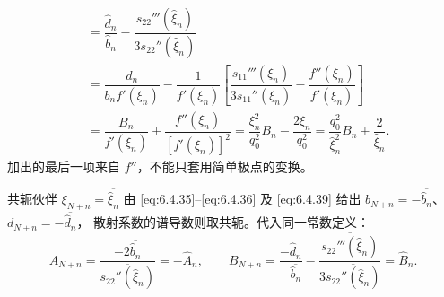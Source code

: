 \documentclass[lang=cn,scheme=chinese,mode=simple,device=normal,color=blue,
math=cm,thmcnt=section,12pt]{elegantbook}
\begin{document}
\begin{callout}[计算：(6.9.6)--(6.9.9) 中四个常数的换叶关系]
\[\begin{aligned}
             & =\dfrac{\widehat d_n}{\widehat b_n}
            -\dfrac{s_{22}'''(\widehat\xi_n)}{3s_{22}''(\widehat\xi_n)}                     \\
             & =\dfrac{d_n}{b_nf'(\xi_n)}
            -\dfrac{1}{f'(\xi_n)}\left[
            \dfrac{s_{11}'''(\xi_n)}{3s_{11}''(\xi_n)}-\dfrac{f''(\xi_n)}{f'(\xi_n)}\right] \\
             & =\dfrac{B_n}{f'(\xi_n)}+\dfrac{f''(\xi_n)}{[f'(\xi_n)]^2}
            =\dfrac{\xi_n^2}{q_0^2}B_n-\dfrac{2\xi_n}{q_0^2}
            =\dfrac{q_0^2}{\widehat\xi_n^2}B_n+\dfrac{2}{\widehat\xi_n}.
        \end{aligned}
    \]
    加出的最后一项来自 $f''$，不能只套用简单极点的变换。

    共轭伙伴 $\xi_{N+n}=\overline{\widehat\xi_n}$ 由 \eqref{eq:6.4.35}--\eqref{eq:6.4.36} 及 \eqref{eq:6.4.39} 给出
    $b_{N+n}=-\overline{\widehat b_n}$、$d_{N+n}=-\overline{\widehat d_n}$，
    散射系数的谱导数则取共轭。代入同一常数定义：
    \[
        A_{N+n}=\dfrac{-2\overline{\widehat b_n}}{\overline{s_{22}''(\widehat\xi_n)}}
        =-\overline{\widehat A_n},\qquad
        B_{N+n}=\dfrac{-\overline{\widehat d_n}}{-\overline{\widehat b_n}}
        -\dfrac{\overline{s_{22}'''(\widehat\xi_n)}}{3\overline{s_{22}''(\widehat\xi_n)}}
        =\overline{\widehat B_n}.
    \]
\end{callout}
\end{document}
